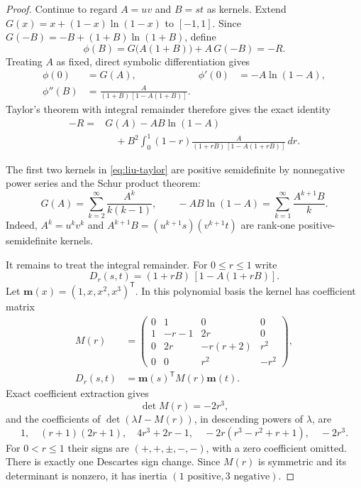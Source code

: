 \documentclass[11pt]{article}
\theoremstyle{plain}
\theoremstyle{definition}
\theoremstyle{remark}
\begin{document}
\begin{proof}
Continue to regard $A=uv$ and $B=st$ as kernels.  Extend
$G(x)=x+(1-x)\ln(1-x)$ to $[-1,1]$.  Since
$G(-B)=-B+(1+B)\ln(1+B)$, define
\[
\phi(B)=G\bigl(A(1+B)\bigr)+A\,G(-B)=-R.
\]
Treating $A$ as fixed, direct symbolic differentiation gives
\begin{align*}
\phi(0)&=G(A),&
\phi'(0)&=-A\ln(1-A),\\
\phi''(B)&=\frac{A}{(1+B)\,[1-A(1+B)]}.&&
\end{align*}
Taylor's theorem with integral remainder therefore gives the exact identity
\begin{equation}
\begin{aligned}
-R
={}&G(A)-AB\ln(1-A)\\
&\quad+B^2\int_0^1(1-r)
\frac{A}{(1+rB)\,[1-A(1+rB)]}\,dr.
\end{aligned}
\label{eq:liu-taylor}
\end{equation}

The first two kernels in \eqref{eq:liu-taylor} are positive semidefinite by
nonnegative power series and the Schur product theorem:
\[
G(A)=\sum_{k=2}^{\infty}\frac{A^k}{k(k-1)},\qquad
-AB\ln(1-A)=\sum_{k=1}^{\infty}\frac{A^{k+1}B}{k}.
\]
Indeed, $A^k=u^kv^k$ and
$A^{k+1}B=(u^{k+1}s)(v^{k+1}t)$ are rank-one positive-semidefinite kernels.

It remains to treat the integral remainder.  For $0\le r\le1$ write
\[
D_r(s,t)=(1+rB)\,[1-A(1+rB)].
\]
Let $\mathbf m(x)=(1,x,x^2,x^3)^{\mathsf T}$.  In this polynomial basis the
kernel has coefficient matrix
\begin{equation}
\begin{aligned}
M(r)&=
\begin{pmatrix}
0&1&0&0\\
1&-r-1&2r&0\\
0&2r&-r(r+2)&r^2\\
0&0&r^2&-r^2
\end{pmatrix},\\
D_r(s,t)&=\mathbf m(s)^{\mathsf T}M(r)\mathbf m(t).
\end{aligned}
\label{eq:liu-M}
\end{equation}
Exact coefficient extraction gives
\[
\det M(r)=-2r^3,
\]
and the coefficients of $\det(\lambda I-M(r))$, in descending powers of
$\lambda$, are
\begin{equation}
1,\quad (r+1)(2r+1),\quad 4r^3+2r-1,\quad
-2r(r^3-r^2+r+1),\quad -2r^3.
\label{eq:liu-charpoly}
\end{equation}
For $0<r\le1$ their signs are
$(+,+,\mathord\pm,-,-)$, with a zero coefficient omitted.  There is exactly
one Descartes sign change.  Since $M(r)$ is symmetric and its determinant is
nonzero, it has inertia $(1\text{ positive},3\text{ negative})$.


\end{proof}
\end{document}

